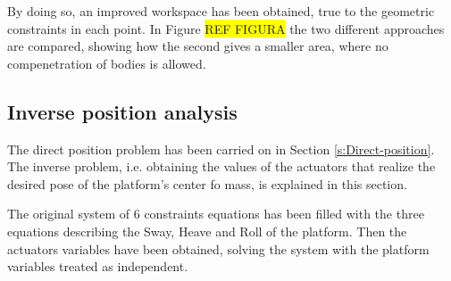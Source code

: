 \documentclass[10.5pt, twocolumn]{article}
\begin{document}
By doing so, an improved workspace has been obtained, true to the geometric constraints in each point. In Figure \colorbox{yellow}{REF FIGURA} the two different approaches are compared, showing how the second gives a smaller area, where no compenetration of bodies is allowed.

\subsection{Inverse position analysis}
\label{s:Inverse-position}
The direct position problem has been carried on in Section \ref{s:Direct-position}. The inverse problem, i.e. obtaining the values of the actuators that realize the desired pose of the platform's center fo mass, is explained in this section.

The original system of 6 constraints equations has been filled with the three equations describing the Sway, Heave and Roll of the platform. Then the actuators variables have been obtained, solving the system with the platform variables treated as independent.
\end{document}
